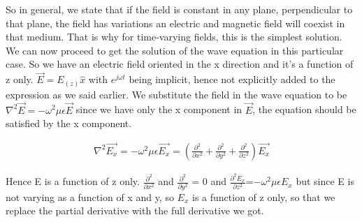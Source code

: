 So in general, we state that if the field is constant in any plane, perpendicular to that plane, the field has variations an electric and magnetic field will coexist in that medium. That is why for time-varying fields, this is the simplest solution. We can now proceed to get the solution of the wave equation in this particular case. So we have an electric field oriented in the x direction and it's a function of z only. $\vec{E}=E_(z)\hat{x}$ with $e^{j\omega t}$ being implicit, hence not explicitly added to the expression as we said earlier. We substitute the field in the wave equation to be $\nabla^2\vec{E}=-\omega^2\mu\epsilon\vec{E}$ since we have only the x component in $\vec{E}$, the equation should be satisfied by the x component.

\begin{align}
\nabla^2\vec{E_{x}}=-\omega^2\mu\epsilon\vec{E_{x}} =( {\frac{\partial^2}{\partial x^2} + \frac{\partial^2}{\partial y^2} + \frac{\partial^2}{\partial z^2}})\vec{E_{x}}
\end{align}

Hence E is a function of z only.
$\frac{\partial^2}{\partial x^2}$ and $\frac{\partial^2}{\partial y^2}$ = 0 and $\frac{\partial^2 E_x}{\partial z^2}$=$-\omega^2\mu\epsilon E_{x}$ but since E is not varying as a function of x and y, so $E_x$ is a function of z only, so that we replace the partial derivative with the full derivative we got.

